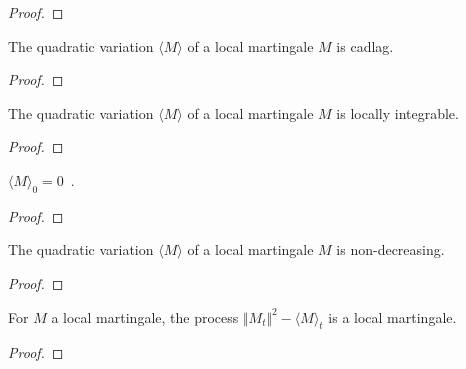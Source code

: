 \begin{proof}

\end{proof}


\begin{lemma}\label{lem:cadlag_quadraticVariation}
The quadratic variation $\langle M \rangle$ of a local martingale $M$ is cadlag.
\end{lemma}

\begin{proof}

\end{proof}


\begin{lemma}\label{lem:locallyIntegrable_quadraticVariation}
The quadratic variation $\langle M \rangle$ of a local martingale $M$ is locally integrable.
\end{lemma}

\begin{proof}

\end{proof}


\begin{lemma}\label{lem:quadraticVariation_zero}
$\langle M \rangle_0 = 0$~.
\end{lemma}

\begin{proof}

\end{proof}


\begin{lemma}\label{lem:monotone_quadraticVariation}
The quadratic variation $\langle M \rangle$ of a local martingale $M$ is non-decreasing.
\end{lemma}

\begin{proof}

\end{proof}


\begin{lemma}\label{lem:local_martingale_sub_quadraticVariation}
For $M$ a local martingale, the process $\Vert M_t \Vert^2 - \langle M \rangle_t$ is a local martingale.
\end{lemma}

\begin{proof}

\end{proof}


